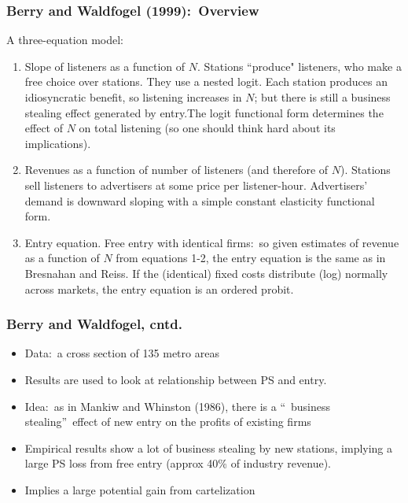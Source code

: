 \documentclass[xcolor=pdftex,dvipsnames,table,mathserif]{beamer}
\begin{document}
\begin{frame}
\frametitle{Berry and Waldfogel (1999):\ Overview}

A three-equation model:

\begin{enumerate}
\item Slope of listeners as a function of $N.$ Stations ``produce" listeners,
who make a free choice over stations. They use a nested logit. Each station
produces an idiosyncratic benefit, so listening increases in $N$; but there
is still a business stealing effect generated by entry.The logit functional
form determines the effect of $N$ on total listening (so one should think
hard about its implications).

\item Revenues as a function of number of listeners (and therefore of $N$).
Stations sell listeners to advertisers at some price per listener-hour.
Advertisers' demand is downward sloping with a simple constant elasticity
functional form.

\item Entry equation. Free entry with identical firms:\ so given estimates
of revenue as a function of $N$ from equations 1-2, the entry equation is
the same as in Bresnahan and Reiss. If the
(identical) fixed costs distribute (log) normally across markets, the entry
equation is an ordered probit.
\end{enumerate}
\end{frame}



\begin{frame}
\frametitle{Berry and Waldfogel, cntd.}
\begin{itemize}
\item Data:\ a cross section of 135 metro areas
\item Results are used to look at relationship between PS and entry.
\item Idea:\ as in Mankiw and Whinston (1986), there is a \textquotedblleft\
business stealing\textquotedblright\ effect of new entry on the profits of
existing firms
\item Empirical results show a lot of business stealing by new stations,
implying a large PS loss from free entry (approx 40\% of industry revenue).
\item Implies a large potential gain from cartelization
\end{itemize}
\end{frame}
\end{document}
